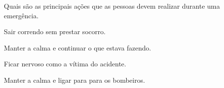 Quais são as principais ações que as pessoas devem realizar durante uma emergência. 

\begin{escolha}
\item Sair correndo sem prestar socorro.

\item Manter a calma e continuar o que estava fazendo.

\item Ficar nervoso como a vítima do acidente.

\item Manter a calma e ligar para para os bombeiros.
\end{escolha}

